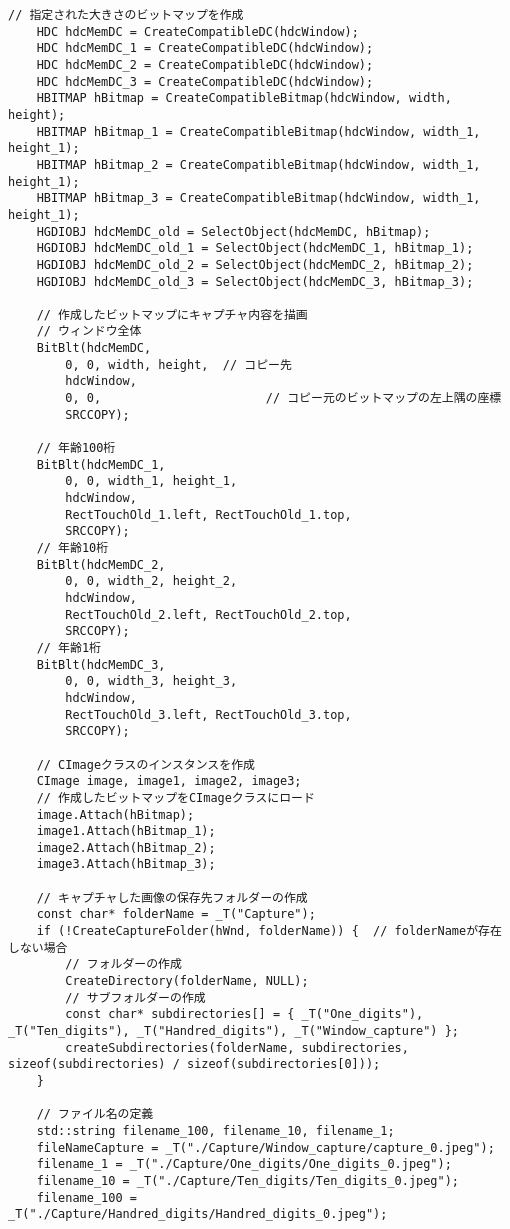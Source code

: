 \begin{lstlisting}[caption=UserInfoWindow.cpp]
	// 指定された大きさのビットマップを作成
	HDC hdcMemDC = CreateCompatibleDC(hdcWindow);
	HDC hdcMemDC_1 = CreateCompatibleDC(hdcWindow); 
	HDC hdcMemDC_2 = CreateCompatibleDC(hdcWindow);
	HDC hdcMemDC_3 = CreateCompatibleDC(hdcWindow);
	HBITMAP hBitmap = CreateCompatibleBitmap(hdcWindow, width, height);
	HBITMAP hBitmap_1 = CreateCompatibleBitmap(hdcWindow, width_1, height_1);
	HBITMAP hBitmap_2 = CreateCompatibleBitmap(hdcWindow, width_1, height_1);
	HBITMAP hBitmap_3 = CreateCompatibleBitmap(hdcWindow, width_1, height_1);
	HGDIOBJ hdcMemDC_old = SelectObject(hdcMemDC, hBitmap);
	HGDIOBJ hdcMemDC_old_1 = SelectObject(hdcMemDC_1, hBitmap_1);
	HGDIOBJ hdcMemDC_old_2 = SelectObject(hdcMemDC_2, hBitmap_2);
	HGDIOBJ hdcMemDC_old_3 = SelectObject(hdcMemDC_3, hBitmap_3);

	// 作成したビットマップにキャプチャ内容を描画
	// ウィンドウ全体
	BitBlt(hdcMemDC,
		0, 0, width, height,  // コピー先
		hdcWindow,
		0, 0,                       // コピー元のビットマップの左上隅の座標
		SRCCOPY);

	// 年齢100桁
	BitBlt(hdcMemDC_1, 
		0, 0, width_1, height_1,                            
		hdcWindow, 
		RectTouchOld_1.left, RectTouchOld_1.top, 
		SRCCOPY);
	// 年齢10桁
	BitBlt(hdcMemDC_2,
		0, 0, width_2, height_2,                             
		hdcWindow,
		RectTouchOld_2.left, RectTouchOld_2.top, 
		SRCCOPY);
	// 年齢1桁
	BitBlt(hdcMemDC_3,
		0, 0, width_3, height_3,                            
		hdcWindow,
		RectTouchOld_3.left, RectTouchOld_3.top, 
		SRCCOPY);

	// CImageクラスのインスタンスを作成
	CImage image, image1, image2, image3;
	// 作成したビットマップをCImageクラスにロード
	image.Attach(hBitmap);
	image1.Attach(hBitmap_1);
	image2.Attach(hBitmap_2);
	image3.Attach(hBitmap_3);

	// キャプチャした画像の保存先フォルダーの作成
	const char* folderName = _T("Capture");
	if (!CreateCaptureFolder(hWnd, folderName)) {  // folderNameが存在しない場合
		// フォルダーの作成
		CreateDirectory(folderName, NULL);
		// サブフォルダーの作成
		const char* subdirectories[] = { _T("One_digits"), _T("Ten_digits"), _T("Handred_digits"), _T("Window_capture") };
		createSubdirectories(folderName, subdirectories, sizeof(subdirectories) / sizeof(subdirectories[0]));
	}
	
	// ファイル名の定義
	std::string filename_100, filename_10, filename_1;
	fileNameCapture = _T("./Capture/Window_capture/capture_0.jpeg");
	filename_1 = _T("./Capture/One_digits/One_digits_0.jpeg");
	filename_10 = _T("./Capture/Ten_digits/Ten_digits_0.jpeg");
	filename_100 = _T("./Capture/Handred_digits/Handred_digits_0.jpeg");


\end{lstlisting}
